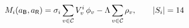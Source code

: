 
\color{ink}$\displaystyle
M_i(a_{\mathsf{B}},a_{\mathsf{R}})=\sigma_i\sum_{v\in\mathcal{C}}V^i_v\,\phi_v-\Lambda\sum_{v\in\mathcal{C}}\rho_v,\qquad |S_i|=14
$
